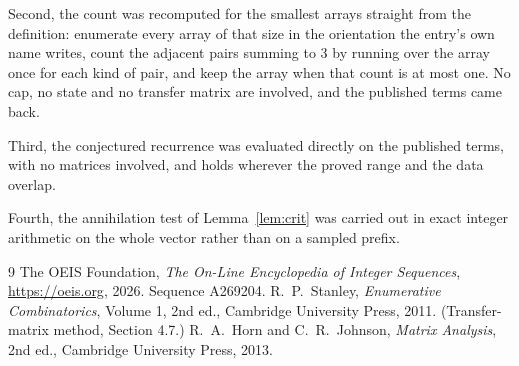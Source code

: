 \documentclass[11pt,a4paper]{article}
\theoremstyle{plain}
\theoremstyle{definition}
\begin{document}
Second, the count was recomputed for the smallest arrays straight from the definition:
enumerate every array of that size in the orientation the entry's own name writes, count the
adjacent pairs summing to $3$ by running over the array once for each kind of pair, and keep
the array when that count is at most one. No cap, no state and no transfer matrix are involved, and
the published terms came back.

Third, the conjectured recurrence was evaluated directly on the published terms, with no
matrices involved, and holds wherever the proved range and the data overlap.

Fourth, the annihilation test of Lemma~\ref{lem:crit} was carried out in exact integer
arithmetic on the whole vector rather than on a sampled prefix.

\begin{thebibliography}{9}
 The OEIS Foundation, \emph{The On-Line Encyclopedia of Integer
Sequences}, \url{https://oeis.org}, 2026. Sequence A269204.
 R.~P.~Stanley, \emph{Enumerative Combinatorics}, Volume 1, 2nd ed.,
Cambridge University Press, 2011. (Transfer-matrix method, Section 4.7.)
 R.~A.~Horn and C.~R.~Johnson, \emph{Matrix Analysis}, 2nd ed., Cambridge
University Press, 2013.
\end{thebibliography}
\end{document}
